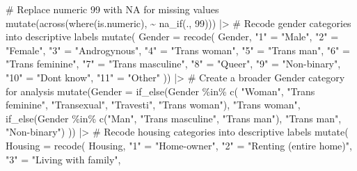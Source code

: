 \documentclass[
  bookmarksnumbered]{article}
\newenvironment{Shaded}{\begin{snugshade}}{\end{snugshade}}
\newcommand{\AttributeTok}[1]{\textcolor[rgb]{0.80,0.80,0.80}{#1}}
\newcommand{\CommentTok}[1]{\textcolor[rgb]{0.50,0.62,0.50}{#1}}
\newcommand{\DecValTok}[1]{\textcolor[rgb]{0.86,0.86,0.80}{#1}}
\newcommand{\FunctionTok}[1]{\textcolor[rgb]{0.94,0.94,0.56}{#1}}
\newcommand{\NormalTok}[1]{\textcolor[rgb]{0.80,0.80,0.80}{#1}}
\newcommand{\OtherTok}[1]{\textcolor[rgb]{0.94,0.94,0.56}{#1}}
\newcommand{\SpecialCharTok}[1]{\textcolor[rgb]{0.86,0.64,0.64}{#1}}
\newcommand{\StringTok}[1]{\textcolor[rgb]{0.80,0.58,0.58}{#1}}
\begin{document}
\begin{Shaded}
\begin{Highlighting}[]
  \CommentTok{\# Replace numeric 99 with NA for missing values}
  \FunctionTok{mutate}\NormalTok{(}\FunctionTok{across}\NormalTok{(}\FunctionTok{where}\NormalTok{(is.numeric), }\SpecialCharTok{\textasciitilde{}} \FunctionTok{na\_if}\NormalTok{(., }\DecValTok{99}\NormalTok{))) }\SpecialCharTok{|\textgreater{}}
  \CommentTok{\# Recode gender categories into descriptive labels}
  \FunctionTok{mutate}\NormalTok{(}
    \AttributeTok{Gender =} \FunctionTok{recode}\NormalTok{(}
\NormalTok{      Gender,}
      \StringTok{"1"} \OtherTok{=} \StringTok{"Male"}\NormalTok{,}
      \StringTok{"2"} \OtherTok{=} \StringTok{"Female"}\NormalTok{,}
      \StringTok{"3"} \OtherTok{=} \StringTok{"Androgynous"}\NormalTok{,}
      \StringTok{"4"} \OtherTok{=} \StringTok{"Trans woman"}\NormalTok{,}
      \StringTok{"5"} \OtherTok{=} \StringTok{"Trans man"}\NormalTok{,}
      \StringTok{"6"} \OtherTok{=} \StringTok{"Trans feminine"}\NormalTok{,}
      \StringTok{"7"} \OtherTok{=} \StringTok{"Trans masculine"}\NormalTok{,}
      \StringTok{"8"} \OtherTok{=} \StringTok{"Queer"}\NormalTok{,}
      \StringTok{"9"} \OtherTok{=} \StringTok{"Non{-}binary"}\NormalTok{,}
      \StringTok{"10"} \OtherTok{=} \StringTok{"Don\textquotesingle{}t know"}\NormalTok{,}
      \StringTok{"11"} \OtherTok{=} \StringTok{"Other"}
\NormalTok{    )) }\SpecialCharTok{|\textgreater{}}
  \CommentTok{\# Create a broader Gender category for analysis}
  \FunctionTok{mutate}\NormalTok{(}\AttributeTok{Gender =} \FunctionTok{if\_else}\NormalTok{(Gender }\SpecialCharTok{\%in\%} \FunctionTok{c}\NormalTok{(}
    \StringTok{"Woman"}\NormalTok{, }\StringTok{"Trans feminine"}\NormalTok{, }\StringTok{"Transexual"}\NormalTok{, }\StringTok{"Travesti"}\NormalTok{, }\StringTok{"Trans woman"}\NormalTok{),}
    \StringTok{"Trans woman"}\NormalTok{,  }
    \FunctionTok{if\_else}\NormalTok{(Gender }\SpecialCharTok{\%in\%} \FunctionTok{c}\NormalTok{(}\StringTok{"Man"}\NormalTok{, }\StringTok{"Trans masculine"}\NormalTok{, }\StringTok{"Trans man"}\NormalTok{),}
            \StringTok{"Trans man"}\NormalTok{,}
            \StringTok{"Non{-}binary"}\NormalTok{)}
\NormalTok{  )) }\SpecialCharTok{|\textgreater{}}
  \CommentTok{\# Recode housing categories into descriptive labels}
  \FunctionTok{mutate}\NormalTok{(}
    \AttributeTok{Housing =} \FunctionTok{recode}\NormalTok{(}
\NormalTok{      Housing,}
      \StringTok{"1"} \OtherTok{=} \StringTok{"Home{-}owner"}\NormalTok{,}
      \StringTok{"2"} \OtherTok{=} \StringTok{"Renting (entire home)"}\NormalTok{,}
      \StringTok{"3"} \OtherTok{=} \StringTok{"Living with family"}\NormalTok{,}

\end{Highlighting}
\end{Shaded}
\end{document}
